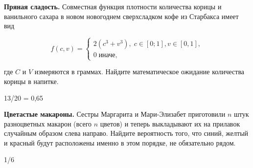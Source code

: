 \documentclass[12pt, addpoints]{exam} %
\begin{document}
\begin{questions}
\question \textbf{Пряная сладость.} Совместная функция плотности количества корицы и ванильного сахара в новом новогоднем сверхсладком кофе из Старбакса имеет вид

      \[
		f(c,v)=\begin{cases}
		2(c^3 + v^3), \; c \in [0;1], v \in [0,1], \\
		0\; \text{иначе,}
		\end{cases}
		\]

где $C$ и $V$  измеряются в граммах. Найдите математическое ожидание количества корицы в напитке.

\begin{solution}
13/20 = 0,65
\end{solution}


\question  \textbf{Цветастые макароны.} Сестры Маргарита и Мари-Элизабет приготовили $n$ штук разноцветных макарон (всего $n$ цветов) и теперь выкладывают их на прилавок случайным образом слева направо. Найдите вероятность того, что синий, желтый и красный будут расположены именно в этом порядке, не обязательно рядом.

\begin{solution}
1/6
\end{solution}

\end{questions}

\end{document}
